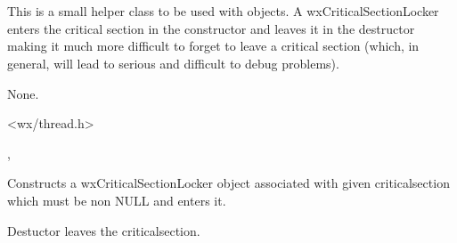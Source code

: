 \section{}\label{wxcriticalsectionlocker}

This is a small helper class to be used with  
objects. A wxCriticalSectionLocker enters the critical section in the
constructor and leaves it in the destructor making it much more difficult to
forget to leave a critical section (which, in general, will lead to serious
and difficult to debug problems).


None.


<wx/thread.h>


, 


\label{wxcriticalsectionlockerctor}


Constructs a wxCriticalSectionLocker object associated with given
criticalsection which must be non NULL and enters it.

\label{wxcriticalsectionlockerdtor}


Destuctor leaves the criticalsection.

